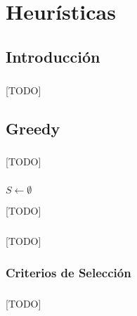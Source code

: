 \documentclass{subfiles}
\begin{document}
  \chapter{Heurísticas}
  \label{chap:heuristics}

    \section{Introducción}
    \label{sec:heuristics_introduction}

      \paragraph{}
      [TODO]

    \section{Greedy}
    \label{sec:heuristics_greedy}

      \paragraph{}
      [TODO]


      \paragraph{}
      \begin{algorithm}
        \SetAlgoLined
        $S \gets \emptyset$\;
        \caption{[TODO]}
        \label{code:heuristics_greedy}
      \end{algorithm}


      \paragraph{}
      [TODO]

      \subsection{Criterios de Selección}
      \label{sec:heuristics_greedy_criterions}

        \paragraph{}
        [TODO]
\end{document}
